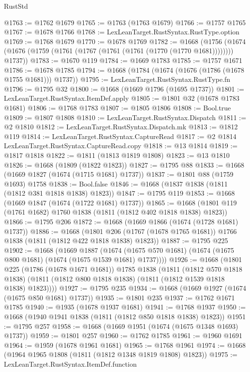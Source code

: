 \begin{lexlean}{RustStd}
\begin{coremodule}
@1763 := @1762 @1679
@1765 := @1763 (@1763 @1679)
@1766 := @1757 @1765
@1767 := @1678 @1766
@1768 := LexLeanTarget.RustSyntax.RustType.option
@1769 := @1768 @1679
@1770 := @1678 @1769
@1782 := @1668
    (@1756 (@1674 (@1676 (@1759 (@1761 (@1767 (@1761 (@1761 (@1770 (@1770 @1681)))))))) @1737))
@1783 := @1670 @119
@1784 := @1669 @1783
@1785 := @1757 @1671
@1786 := @1678 @1785
@1794 := @1668 (@1784 (@1674 (@1676 (@1786 (@1678 @1755 @1681))) @1737))
@1795 := LexLeanTarget.RustSyntax.RustType.fn
@1796 := @1795 @32
@1800 := @1668 (@1669 @1796 (@1695 @1737))
@1801 := LexLeanTarget.RustSyntax.ItemDef.apply
@1805 := @1801 @32 (@1678 @1783 @1681)
@1806 := @1768 @1783
@1807 := @1805 @1806
@1808 := Bool.true
@1809 := @1807 @1808
@1810 := LexLeanTarget.RustSyntax.Dispatch
@1811 := @2 @1810
@1812 := LexLeanTarget.RustSyntax.Dispatch.mk
@1813 := @1812 @119
@1814 := LexLeanTarget.RustSyntax.CaptureRead
@1817 := @2 @1814 LexLeanTarget.RustSyntax.CaptureRead.copy
@1818 := @13 @1814
@1819 := @1817 @1818
@1822 := @1811 (@1813 @1819 @1808)
@1823 := @13 @1810
@1826 := @1668 (@1809 (@1822 @1823))
@1827 := @1795 @88
@1833 := @1668 (@1669 @1827 (@1674 (@1715 @1681) @1737))
@1837 := @1801 @88 (@1759 @1693) @1758
@1838 := Bool.false
@1846 := @1668 (@1837 @1838 (@1811 (@1812 @381 @1818 @1838) @1823))
@1847 := @1795 @119
@1853 := @1668 (@1669 @1847 (@1674 (@1722 @1681) @1737))
@1865 := @1668 (@1801 @119 (@1761 @1682) @1760 @1838 (@1811 (@1812 @402 @1818 @1838) @1823))
@1866 := @1795 @206
@1872 := @1668 (@1669 @1866 (@1674 (@1728 @1681) @1737))
@1886 := @1668
    (@1801 @206 (@1767 (@1678 @1765 @1681)) @1766 @1838 (@1811 (@1812 @422 @1818 @1838) @1823))
@1887 := @1795 @225
@1902 := @1668
    (@1669
      @1887
      (@1674 (@1675 @570 @1681) (@1674 (@1675 @800 @1681) (@1674 (@1675 @1539 @1681) @1737))))
@1926 := @1668
    (@1801
      @225
      (@1786 (@1678 @1671 @1681))
      @1785
      @1838
      (@1811
        (@1812 @570 @1818 @1838)
        (@1811 (@1812 @800 @1818 @1838) (@1811 (@1812 @1539 @1818 @1838) @1823))))
@1927 := @1795 @235
@1934 := @1668 (@1669 @1927 (@1674 (@1675 @850 @1681) @1737))
@1935 := @1801 @235
@1937 := @1762 @1671 @1785
@1940 := @1935 (@1678 @1937 @1681)
@1941 := @1768 @1937
@1950 := @1668 (@1940 @1941 @1838 (@1811 (@1812 @850 @1818 @1838) @1823))
@1951 := @1795 @257
@1958 := @1668 (@1669 @1951 (@1674 (@1675 @1348 @1693) @1737))
@1959 := @1801 @257
@1960 := @1762 @1785
@1961 := @1960 @1691
@1964 := @1959 (@1678 @1961 @1681)
@1965 := @1768 @1961
@1974 := @1668 (@1964 @1965 @1808 (@1811 (@1812 @1348 @1819 @1808) @1823))
@1975 := LexLeanTarget.RustSyntax.ItemDef.function

\end{coremodule}
\end{lexlean}
